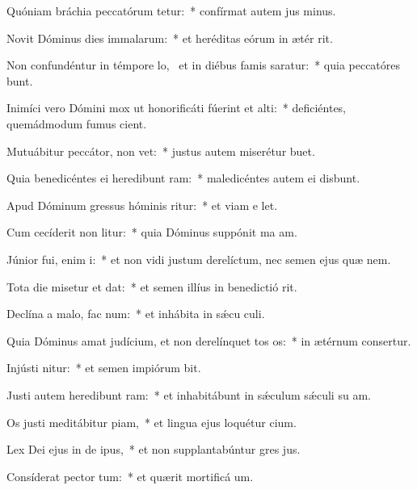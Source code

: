 \item Quóniam bráchia peccatórum tetur:~* confírmat autem jus minus.
\item Novit Dóminus dies immalarum:~* et heréditas eórum in ætér rit.
\item Non confundéntur in témpore lo,~\pscross{} et in diébus famis saratur:~* quia peccatóres bunt.
\item Inimíci vero Dómini mox ut honorificáti fúerint et alti:~* deficiéntes, quemádmodum fumus cient.
\item Mutuábitur peccátor,  non vet:~* justus autem miserétur  buet.
\item Quia benedicéntes ei heredibunt ram:~* maledicéntes autem ei disbunt.
\item Apud Dóminum gressus hóminis ritur:~* et viam e let.
\item Cum cecíderit non litur:~* quia Dóminus suppónit ma am.
\item Júnior fui, enim i:~* et non vidi justum derelíctum, nec semen ejus quæ nem.
\item Tota die misetur et dat:~* et semen illíus in benedictió rit.
\item Declína a malo,  fac num:~* et inhábita in sǽcu culi.
\item Quia Dóminus amat judícium, et non derelínquet tos os:~* in ætérnum consertur.
\item Injústi nitur:~* et semen impiórum bit.
\item Justi autem heredibunt ram:~* et inhabitábunt in sǽculum sǽculi su am.
\item Os justi meditábitur piam,~* et lingua ejus loquétur cium.
\item Lex Dei ejus in de ipus,~* et non supplantabúntur gres jus.
\item Consíderat pector tum:~* et quærit mortificá um.
